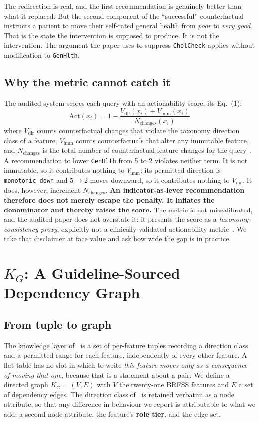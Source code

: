 \documentclass[conference]{IEEEtran}
\begin{document}
The redirection is real, and the first recommendation is genuinely better than what it replaced. But the second component of the ``successful'' counterfactual instructs a patient to move their self-rated general health from \emph{poor} to \emph{very good}. That is the state the intervention is supposed to produce. It is not the intervention. The argument the paper uses to suppress \texttt{CholCheck} applies without modification to \texttt{GenHlth}.

\subsection{Why the metric cannot catch it}
The audited system scores each query with an actionability score, its Eq.~(1):
\begin{equation}
\mathrm{Act}(x_i) = 1 - \frac{V_{\mathrm{dir}}(x_i) + V_{\mathrm{imm}}(x_i)}{N_{\mathrm{changes}}(x_i)}
\end{equation}
where $V_{\mathrm{dir}}$ counts counterfactual changes that violate the taxonomy direction class of a feature, $V_{\mathrm{imm}}$ counts counterfactuals that alter any immutable feature, and $N_{\mathrm{changes}}$ is the total number of counterfactual feature changes for the query~\cite{thieu2026}. A recommendation to lower \texttt{GenHlth} from 5 to 2 violates neither term. It is not immutable, so it contributes nothing to $V_{\mathrm{imm}}$; its permitted direction is \texttt{monotonic\_down} and $5\rightarrow2$ moves downward, so it contributes nothing to $V_{\mathrm{dir}}$. It does, however, increment $N_{\mathrm{changes}}$. \textbf{An indicator-as-lever recommendation therefore does not merely escape the penalty. It inflates the denominator and thereby raises the score.} The metric is not miscalibrated, and the audited paper does not overstate it: it presents the score as a \emph{taxonomy-consistency proxy}, explicitly not a clinically validated actionability metric~\cite{thieu2026}. We take that disclaimer at face value and ask how wide the gap is in practice.

\section{$K_G$: A Guideline-Sourced Dependency Graph}
\subsection{From tuple to graph}
The knowledge layer of~\cite{thieu2026} is a set of per-feature tuples recording a direction class and a permitted range for each feature, independently of every other feature. A flat table has no slot in which to write \emph{this feature moves only as a consequence of moving that one}, because that is a statement about a pair. We define a directed graph $K_G = (V, E)$ with $V$ the twenty-one BRFSS features and $E$ a set of dependency edges. The direction class of~\cite{thieu2026} is retained verbatim as a node attribute, so that any difference in behaviour we report is attributable to what we add: a second node attribute, the feature's \textbf{role tier}, and the edge set.
\end{document}
